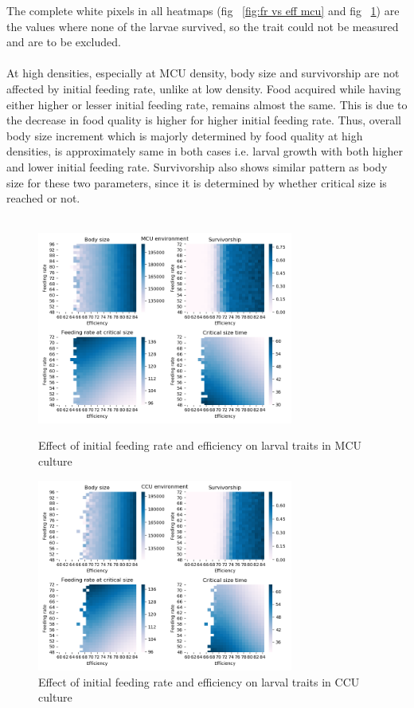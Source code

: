 The complete white pixels in all heatmaps (fig ~\ref{fig:fr vs eff mcu} and fig ~\ref{fig:fr vs eff ccu}) are the values where none of the larvae survived, so the trait could not be measured and are to be excluded.
\\ \\
At high densities, especially at MCU density, body size and survivorship are not affected by initial feeding rate, unlike at low density. Food acquired while having either higher or lesser initial feeding rate, remains almost the same. This is due to the decrease in food quality is higher for higher initial feeding rate. Thus, overall body size increment which is majorly determined by food quality at high densities, is approximately same in both cases i.e. larval growth with both higher and lower initial feeding rate. Survivorship also shows similar pattern as body size for these two parameters, since it is determined by whether critical size is reached or not.\\ \\
\begin{figure}[!tbp]
  \centering
  \includegraphics[width=0.75\textwidth]{C3/Figs/Feeding_rate_vs_Efficiency_MCU}
  \caption{Effect of initial feeding rate and efficiency on larval traits in MCU culture}
  \label{fig:fr vs eff mcu}
  \vspace{24pt}
  \includegraphics[width=0.75\textwidth]{C3/Figs/Feeding_rate_vs_Efficiency_CCU}
  \caption{Effect of initial feeding rate and efficiency on larval traits in CCU culture}
  \label{fig:fr vs eff ccu}
\end{figure}
\newpage

